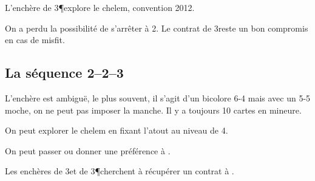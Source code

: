 \begin{multicols}{2}
 L'enchère de 3\P explore le chelem, convention 2012.

 On a perdu la possibilité de s'arrêter à 2\NT. Le contrat de 3\K reste un bon compromis en cas de misfit.

 \subsection*{ La séquence 2\K--2\C--3\T}

 L'enchère est ambiguë, le plus souvent, il s'agit d'un bicolore 6-4 mais avec un 5-5 moche, on ne peut pas imposer la manche. Il y a toujours 10 cartes en mineure.

 On peut explorer le chelem en fixant l'atout au niveau de 4.

 On peut passer ou donner une préférence à \K.

 Les enchères de 3\C et de 3\P cherchent à récupérer un contrat à \NT.

\end{multicols}
